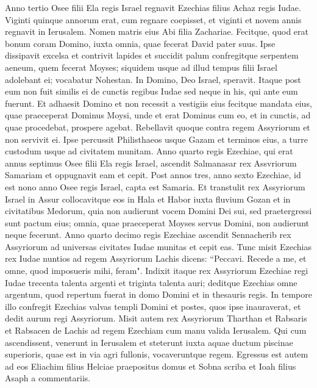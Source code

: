\begin{biblechapter}  
\verse Anno tertio Osee filii Ela regis Israel regnavit Ezechias filius Achaz regis Iudae. 
\verse Viginti quinque annorum erat, cum regnare coepisset, et viginti et novem annis regnavit in Ierusalem. Nomen matris eius Abi filia Zachariae. 
\verse Fecitque, quod erat bonum coram Domino, iuxta omnia, quae fecerat David pater suus. 
\verse Ipse dissipavit excelsa et contrivit lapides et succidit palum confregitque serpentem aeneum, quem fecerat Moyses; siquidem usque ad illud tempus filii Israel adolebant ei; vocabatur Nohestan. 
\verse In Domino, Deo Israel, speravit. Itaque post eum non fuit similis ei de cunctis regibus Iudae sed neque in his, qui ante eum fuerunt. 
\verse Et adhaesit Domino et non recessit a vestigiis eius fecitque mandata eius, quae praeceperat Dominus Moysi, 
\verse unde et erat Dominus cum eo, et in cunctis, ad quae procedebat, prospere agebat. Rebellavit quoque contra regem Assyriorum et non servivit ei. 
\verse Ipse percussit Philisthaeos usque Gazam et terminos eius, a turre custodum usque ad civitatem munitam. 
\verse Anno quarto regis Ezechiae, qui erat annus septimus Osee filii Ela regis Israel, ascendit Salmanasar rex Assvriorum Samariam et oppugnavit eam 
\verse et cepit. Post annos tres, anno sexto Ezechiae, id est nono anno Osee regis Israel, capta est Samaria. 
\verse Et transtulit rex Assyriorum Israel in Assur collocavitque eos in Hala et Habor iuxta fluvium Gozan et in civitatibus Medorum, 
\verse quia non audierunt vocem Domini Dei sui, sed praetergressi sunt pactum eius; omnia, quae praeceperat Moyses servus Domini, non audierunt neque fecerunt. 
\verse Anno quarto decimo regis Ezechiae ascendit Sennacherib rex Assyriorum ad universas civitates Iudae munitas et cepit eas. 
\verse Tunc misit Ezechias rex Iudae nuntios ad regem Assyriorum Lachis dicens: “Peccavi. Recede a me, et omne, quod imposueris mihi, feram". Indixit itaque rex Assyriorum Ezechiae regi Iudae trecenta talenta argenti et triginta talenta auri; 
\verse deditque Ezechias omne argentum, quod repertum fuerat in domo Domini et in thesauris regis. 
\verse In tempore illo confregit Ezechias valvas templi Domini et postes, quos ipse inauraverat, et dedit aurum regi Assyriorum. 
\verse Misit autem rex Assyriorum Tharthan et Rabsaris et Rabsacen de Lachis ad regem Ezechiam cum manu valida Ierusalem. Qui cum ascendissent, venerunt in Ierusalem et steterunt iuxta aquae ductum piscinae superioris, quae est in via agri fullonis, 
\verse vocaveruntque regem. Egressus est autem ad eos Eliachim filius Helciae praepositus domus et Sobna scriba et Ioah filius Asaph a commentariis. 

\end{biblechapter}
